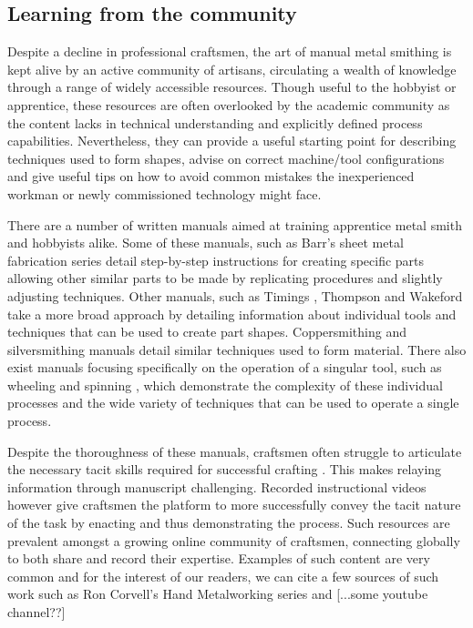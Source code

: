 \subsection{Learning from the community \label{sec:LfC}}
Despite a decline in professional craftsmen, the art of manual metal smithing is kept alive by an active community of artisans, circulating a wealth of knowledge through a range of widely accessible resources. Though useful to the hobbyist or apprentice, these resources are often overlooked by the academic community as the content lacks in technical understanding and explicitly defined process capabilities. Nevertheless, they can provide a useful starting point for describing techniques used to form shapes, advise on correct machine/tool configurations and give useful tips on how to avoid common mistakes the inexperienced workman or newly commissioned technology might face.

There are a number of written manuals aimed at training apprentice metal smith and hobbyists alike. Some of these manuals, such as Barr's sheet metal fabrication series \citep{Barr2013ProfessionalFabrication,Barr2019SheetProjects} detail step-by-step instructions for creating specific parts allowing other similar parts to be made by replicating procedures and slightly adjusting techniques. Other manuals, such as Timings \citep{Timings2008SheetMetalwork}, Thompson \citep{Thompson2007ManufacturingProfessionals} and Wakeford \citep{Wakeford1985SheetWork} take a more broad approach by detailing information about individual tools and techniques that can be used to create part shapes. Coppersmithing \citep{Fuller1904ArtForms} and silversmithing \citep{Hill2014ManufacturingProcesses} manuals detail similar techniques used to form material. There also exist manuals focusing specifically on the operation of a singular tool, such as wheeling \citep{Longyard2014LearningWheel} and spinning \citep{Tuells1912MetalUsed}, which demonstrate the complexity of these individual processes and the wide variety of techniques that can be used to operate a single process.

Despite the thoroughness of these manuals, craftsmen often struggle to articulate the necessary tacit skills required for successful crafting \citep{Wood2009ACraftsmen}. This makes relaying information through manuscript challenging. Recorded instructional videos however give craftsmen the platform to more successfully convey the tacit nature of the task by enacting and thus demonstrating the process. Such resources are prevalent amongst a growing online community of craftsmen, connecting globally to both share and record their expertise. Examples of such content are very common and for the interest of our readers, we can cite a few sources of such work such as Ron Corvell's Hand Metalworking series %
and [...some youtube channel??]

